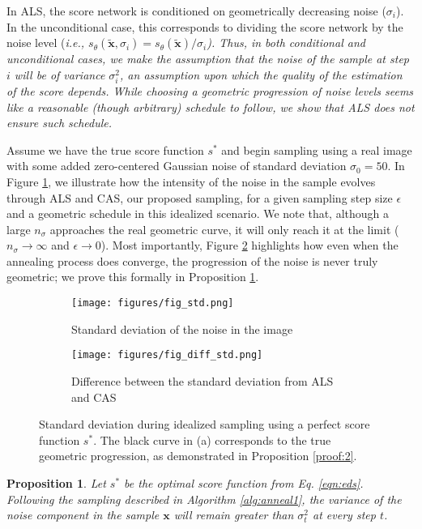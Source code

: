 \documentclass{article} \usepackage{iclr2021_conference_notitle,times}
\theoremstyle{definition}
\theoremstyle{definition}
\newtheorem{proposition}{Proposition}
\begin{document}
In ALS, the score network is conditioned on geometrically decreasing noise ($\sigma_i$). In the unconditional case, this corresponds to dividing the score network by the noise level (\em i.e., \em $s_{\theta}(\boldsymbol{\tilde{x}},\sigma_i)=s_{\theta}(\boldsymbol{\tilde{x}})/\sigma_i$). Thus, in both conditional and unconditional cases, we make the assumption that the noise of the sample at step $i$ will be of variance $\sigma_i^2$, an assumption upon which the quality of the estimation of the score depends. 
While choosing a geometric progression of noise levels seems like a reasonable (though arbitrary) schedule to follow, we show that ALS does not ensure such schedule.

Assume we have the true score function $s^*$ and begin sampling using a real image with some added zero-centered Gaussian noise of standard deviation $\sigma_0 = 50$. In Figure \ref{fig_std}, we illustrate how the intensity of the noise in the sample evolves through ALS and CAS, our proposed sampling, for a given sampling step size $\epsilon$ and a geometric schedule  in this idealized scenario. We note that, although a large $n_\sigma$ approaches the real geometric curve, it will only reach it at the limit ($n_\sigma \to \infty$ and $\epsilon \to 0$). 
Most importantly, Figure \ref{fig_diff_std} highlights how even when the annealing process does converge, the progression of the noise is never truly geometric; we prove this formally in Proposition \ref{prop:1}.

\begin{figure}[ht!] 
\captionsetup[subfigure]{justification=centering}
    \centering
    \begin{subfigure}[t]{0.465\linewidth}
\texttt{[image: figures/fig\_std.png]}
    \caption{Standard deviation of the noise in the image} 
    \label{fig_std} 
  \end{subfigure}
  \begin{subfigure}[t]{0.47\linewidth}
    \texttt{[image: figures/fig\_diff\_std.png]}
    \caption{Difference between the standard deviation from ALS and CAS } 
    \label{fig_diff_std} 
  \end{subfigure} 
  \caption{Standard deviation during idealized sampling using a perfect score function $s^*$. The black curve in (a) corresponds to the true geometric progression, as demonstrated in Proposition \ref{proof:2}.}
  \label{fig:std} 
\end{figure}

\begin{proposition}\label{prop:1}
\em 
Let $s^*$ be the optimal score function from Eq. \ref{eqn:eds}. Following the sampling described in Algorithm \ref{alg:anneal1}, the variance of the noise component in the sample $\boldsymbol{x}$ will remain greater than $\sigma_t^2$ at every step $t$. \em 
\end{proposition}
\end{document}
